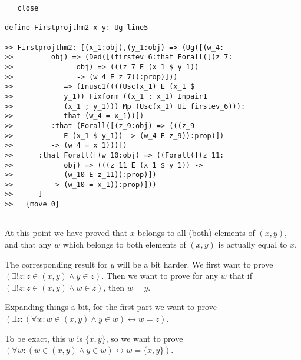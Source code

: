 \documentclass[12pt]{article}
\begin{document}
\begin{verbatim}
   close

define Firstprojthm2 x y: Ug line5

>> Firstprojthm2: [(x_1:obj),(y_1:obj) => (Ug([(w_4:
>>         obj) => (Ded([(firstev_6:that Forall([(z_7:
>>               obj) => (((z_7 E (x_1 $ y_1))
>>               -> (w_4 E z_7)):prop)]))
>>            => (Inusc1((((Usc(x_1) E (x_1 $
>>            y_1)) Fixform ((x_1 ; x_1) Inpair1
>>            (x_1 ; y_1))) Mp (Usc(x_1) Ui firstev_6))):
>>            that (w_4 = x_1))])
>>         :that (Forall([(z_9:obj) => (((z_9
>>            E (x_1 $ y_1)) -> (w_4 E z_9)):prop)])
>>         -> (w_4 = x_1)))])
>>      :that Forall([(w_10:obj) => ((Forall([(z_11:
>>            obj) => (((z_11 E (x_1 $ y_1)) ->
>>            (w_10 E z_11)):prop)])
>>         -> (w_10 = x_1)):prop)]))
>>      ]
>>   {move 0}


\end{verbatim}

At this point we have proved that $x$ belongs to all (both) elements of $(x,y)$, and that any $w$ which belongs to both elements of $(x,y)$ is actually equal to $x$.

The corresponding result for $y$ will be a bit harder.  We first want to prove $(\exists! z: z \in (x,y) \wedge y \in z)$.
Then we want to prove for any $w$ that if $(\exists! z: z \in (x,y) \wedge w \in z)$, then $w=y$.

Expanding things a bit, for the first part we want to prove $(\exists z:(\forall w: w \in (x,y) \wedge y \in w) \leftrightarrow w=z)$.

To be exact, this $w$ is $\{x,y\}$, so we want to prove $(\forall w: (w \in (x,y) \wedge y \in w) \leftrightarrow w = \{x,y\})$.
\end{document}
